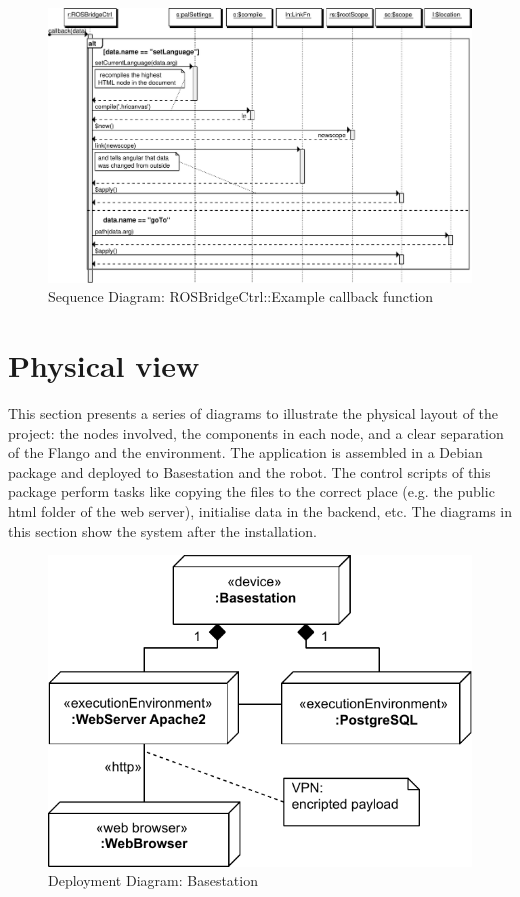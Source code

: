 \begin{figure}
    \centering
    \includegraphics{figures/design/seqdia/ROSBridgeCtrl-callback.pdf}
    \caption{Sequence Diagram: ROSBridgeCtrl::Example callback function}
    \label{fig:design-seqdia-ROSBridgeCtrl-callback}
\end{figure}

\FloatBarrier

\section{Physical view}
This section presents a series of diagrams to illustrate the physical layout of the project: the nodes involved, the components in each node, and a clear separation of the Flango \cm and the environment.
The application is assembled in a Debian package and deployed to Basestation and the robot.
The control scripts of this package perform tasks like copying the files to the correct place (e.g. the public html folder of the web server), initialise data in the backend, etc.
The diagrams in this section show the system after the installation.

\begin{figure}[htb]
    \centering
    \includegraphics{figures/design-deployment-basestation.pdf}
    \caption{Deployment Diagram: Basestation}
    \label{fig:deploy-basestation}
\end{figure}

